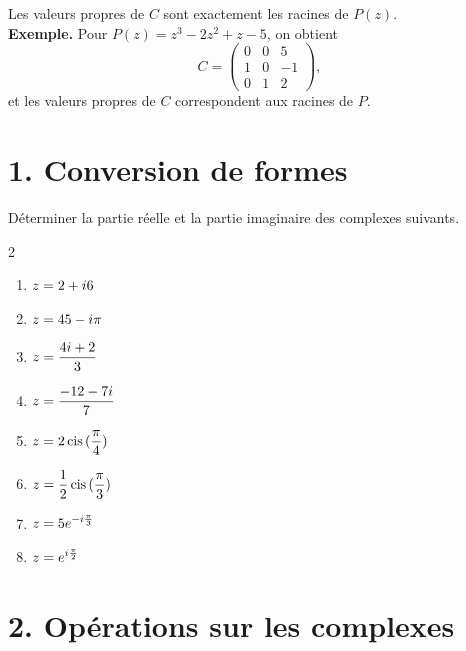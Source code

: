 Les valeurs propres de \(C\) sont exactement les racines de \(P(z)\). \\

\textbf{Exemple.} 
Pour \( P(z) = z^3 - 2z^2 + z - 5 \), on obtient
\[
C = 
\begin{pmatrix}
0 & 0 & 5 \\
1 & 0 & -1 \\
0 & 1 & 2
\end{pmatrix},
\]
et les valeurs propres de \(C\) correspondent aux racines de \(P\).

\newpage

\section*{1. Conversion de formes}

\begin{exercise}
    Déterminer la partie réelle et la partie imaginaire des complexes suivants.
    
    \begin{multicols}{2}
    \begin{enumerate}[label=(\alph*)]
        \item $\displaystyle z = 2 + i6$
        \item $\displaystyle z = 45 - i\pi$
        \item $\displaystyle z = \frac{4i + 2}{3}$
        \item $\displaystyle z = \frac{-12 - 7i}{7}$
        \item $\displaystyle z = 2\operatorname{cis}{(\frac\pi4)}$
        \item $\displaystyle z = \frac12\operatorname{cis}{(\frac\pi3)}$
        \item $\displaystyle z = 5e^{-i\frac\pi3}$
        \item $\displaystyle z = e^{i\frac\pi2}$
    \end{enumerate}
    \end{multicols}
\end{exercise}

\section*{2. Opérations sur les complexes}

